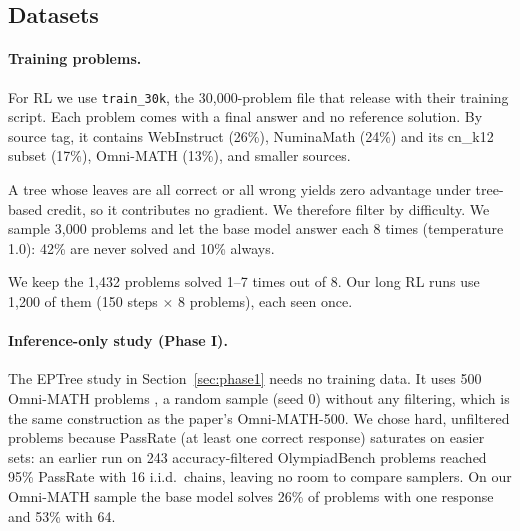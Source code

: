 
\subsection{Datasets}
\label{sec:datasets}

\paragraph{Training problems.}
For RL we use \texttt{train\_30k}, the 30{,}000-problem file that \citet{hou2025treerl} release with their training script. Each problem comes with a final answer and no reference solution. By source tag, it contains WebInstruct (26\%), NuminaMath (24\%) and its cn\_k12 subset (17\%), Omni-MATH (13\%), and smaller sources.

A tree whose leaves are all correct or all wrong yields zero advantage under tree-based credit, so it contributes no gradient. We therefore filter by difficulty. We sample 3{,}000 problems and let the base model answer each 8 times (temperature 1.0): 42\% are never solved and 10\% always.

We keep the 1{,}432 problems solved 1--7 times out of 8. Our long RL runs use 1{,}200 of them (150 steps $\times$ 8 problems), each seen once.

\paragraph{Inference-only study (Phase I).}
The EPTree study in Section~\ref{sec:phase1} needs no training data. It uses 500 Omni-MATH problems \citep{gao2024omnimath}, a random sample (seed 0) without any filtering, which is the same construction as the paper's Omni-MATH-500. We chose hard, unfiltered problems because PassRate (at least one correct response) saturates on easier sets: an earlier run on 243 accuracy-filtered OlympiadBench problems reached 95\% PassRate with 16 i.i.d.\ chains, leaving no room to compare samplers. On our Omni-MATH sample the base model solves 26\% of problems with one response and 53\% with 64.


